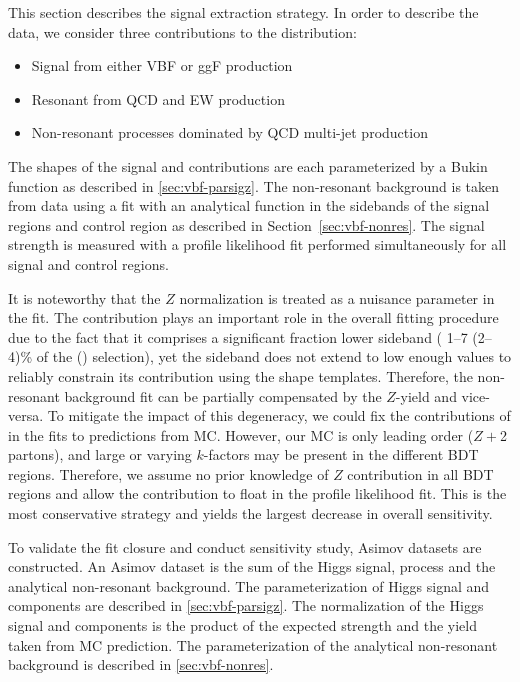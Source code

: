 This section describes the signal extraction strategy. In order to describe the data, we consider three contributions to the \Mbb{} distribution:  
\begin{itemize}
  \item Signal \Hbb from either VBF or ggF production
  \item Resonant \zjets{} from QCD and EW production
  \item Non-resonant processes dominated by QCD multi-jet production
\end{itemize}

The shapes of the signal and \zjets{} contributions are each parameterized by a Bukin function as described in \ref{sec:vbf-parsigz}. The non-resonant background is taken from data using a fit with an analytical function in the \Mbb{} sidebands of the signal regions and control region as described in Section~\ref{sec:vbf-nonres}.
The signal strength is measured with a profile likelihood fit performed simultaneously for all signal and control regions.

It is noteworthy that the $Z$ normalization is treated as a nuisance parameter in the fit. The \zjets{} contribution plays an important role in the overall fitting procedure due to the fact that it comprises a significant fraction lower \Mbb{} sideband ( 1--7 (2--4)\% of the \fourcentral(\twocentral) selection), yet the sideband does not extend to low enough \Mbb{} values to reliably constrain its contribution using the shape templates.  Therefore, the non-resonant background fit can be partially compensated by the $Z$-yield and vice-versa.  To mitigate the impact of this degeneracy, we could fix the contributions of \zjets{} in the fits to predictions from MC.  However, our \zjets{} MC is only leading order ($Z+$2 partons), and large or varying $k$-factors may be present in the different BDT regions.  Therefore, we assume no prior knowledge of $Z$ contribution in all BDT regions and allow the contribution to float in the profile likelihood fit. This is the most conservative strategy and yields the largest decrease in overall sensitivity.

To validate the fit closure and conduct sensitivity study, Asimov datasets are constructed. An Asimov dataset is the sum of the Higgs signal, \zjets{} process and the analytical non-resonant background. The parameterization of Higgs signal and \zjets{} components are described in \ref{sec:vbf-parsigz}. The normalization of the Higgs signal and \zjets{} components is the product of the expected strength and the yield taken from MC prediction. The parameterization of the analytical non-resonant background is described in \ref{sec:vbf-nonres}.

